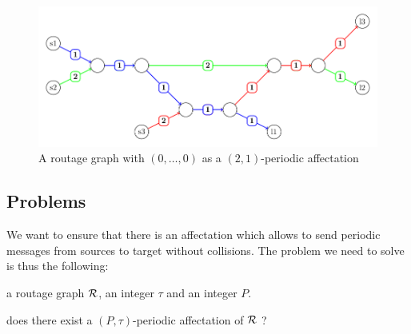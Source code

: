 \documentclass[a4paper,10pt]{article}
\begin{document}
%       
%       
      \begin{figure}[h]
       \begin{center}
      \includegraphics[scale=0.7]{Fig5.pdf}
      \end{center}
       \caption{A routage graph with $(0,\dots,0)$ as a $(2,1)$-periodic affectation}
      \end{figure}




   \subsection{Problems}

    We want to ensure that there is an affectation which allows to send periodic messages from sources to target
    without collisions. The problem we need to solve is thus the following:
    


       a routage graph $\cal R$, an integer $\tau$ and an integer $P$.

       does there exist a $(P,\tau)$-periodic affectation of $\cal R$ ?
\end{document}
